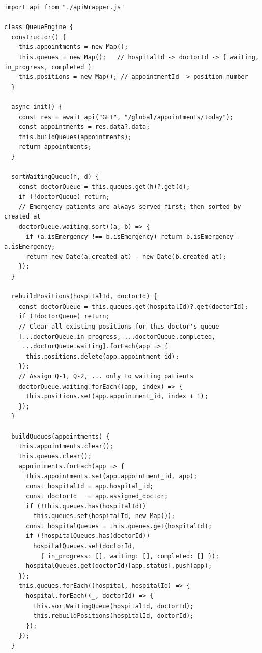 \documentclass[12pt,onecolumn]{IEEEtran}
\begin{document}
\begin{lstlisting}[caption={Queue Engine — in-memory queue management and realtime mutation handlers}]
import api from "./apiWrapper.js"

class QueueEngine {
  constructor() {
    this.appointments = new Map();
    this.queues = new Map();   // hospitalId -> doctorId -> { waiting, in_progress, completed }
    this.positions = new Map(); // appointmentId -> position number
  }

  async init() {
    const res = await api("GET", "/global/appointments/today");
    const appointments = res.data?.data;
    this.buildQueues(appointments);
    return appointments;
  }

  sortWaitingQueue(h, d) {
    const doctorQueue = this.queues.get(h)?.get(d);
    if (!doctorQueue) return;
    // Emergency patients are always served first; then sorted by created_at
    doctorQueue.waiting.sort((a, b) => {
      if (a.isEmergency !== b.isEmergency) return b.isEmergency - a.isEmergency;
      return new Date(a.created_at) - new Date(b.created_at);
    });
  }

  rebuildPositions(hospitalId, doctorId) {
    const doctorQueue = this.queues.get(hospitalId)?.get(doctorId);
    if (!doctorQueue) return;
    // Clear all existing positions for this doctor's queue
    [...doctorQueue.in_progress, ...doctorQueue.completed,
     ...doctorQueue.waiting].forEach(app => {
      this.positions.delete(app.appointment_id);
    });
    // Assign Q-1, Q-2, ... only to waiting patients
    doctorQueue.waiting.forEach((app, index) => {
      this.positions.set(app.appointment_id, index + 1);
    });
  }

  buildQueues(appointments) {
    this.appointments.clear();
    this.queues.clear();
    appointments.forEach(app => {
      this.appointments.set(app.appointment_id, app);
      const hospitalId = app.hospital_id;
      const doctorId   = app.assigned_doctor;
      if (!this.queues.has(hospitalId))
        this.queues.set(hospitalId, new Map());
      const hospitalQueues = this.queues.get(hospitalId);
      if (!hospitalQueues.has(doctorId))
        hospitalQueues.set(doctorId,
          { in_progress: [], waiting: [], completed: [] });
      hospitalQueues.get(doctorId)[app.status].push(app);
    });
    this.queues.forEach((hospital, hospitalId) => {
      hospital.forEach((_, doctorId) => {
        this.sortWaitingQueue(hospitalId, doctorId);
        this.rebuildPositions(hospitalId, doctorId);
      });
    });
  }


\end{lstlisting}
\end{document}
